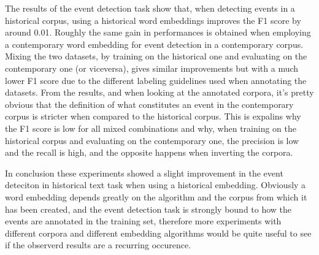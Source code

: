 \documentclass[runningheads]{llncs}
\begin{document}
The results of the event detection task show that, when detecting events in a historical corpus, using a historical word embeddings improves the F1 score by around 0.01. Roughly the same gain in performances is obtained when employing a contemporary word embedding for event detection in a contemporary corpus. Mixing the two datasets, by training on the historical one and evaluating on the contemporary one (or viceversa), gives similar improvements but with a much lower F1 score due to the different labeling guidelines used when annotating the datasets. From the results, and when looking at the annotated corpora, it's pretty obvious that the definition of what constitutes an event in the contemporary corpus is stricter when compared to the historical corpus. This is expalins why the F1 score is low for all mixed combinations and why, when training on the historical corpus and evaluating on the contemporary one, the precision is low and the recall is high, and the opposite happens when inverting the corpora. 

In conclusion these experiments showed a slight improvement in the event deteciton in historical text task when using a historical embedding. Obviously a word embedding depends greatly on the algorithm and the corpus from which it has been created, and the event detection task is strongly bound to how the events are annotated in the training set, therefore more experiments with different corpora and different embedding algorithms would be quite useful to see if the observerd results are a recurring occurence.


\newpage


%




\end{document}
